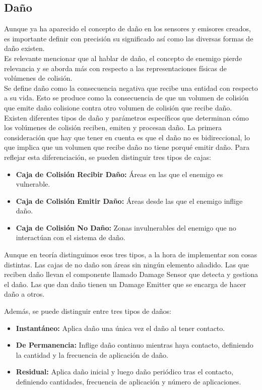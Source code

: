 \subsection{Daño}
Aunque ya ha aparecido el concepto de daño en los sensores y emisores creados, es importante definir con precisión su significado así como las diversas formas de daño existen. \\
Es relevante mencionar que al hablar de daño, el concepto de enemigo pierde relevancia y se aborda más con respecto a las representaciones físicas de volúmenes de colisión.\\
Se define daño como la consecuencia negativa que recibe una entidad con respecto a su vida. Esto se produce como la consecuencia de que un volumen de colisión que emite daño colisione contra otro volumen de colisión que recibe daño.\\
Existen diferentes tipos de daño y parámetros específicos que determinan cómo los volúmenes de colisión reciben, emiten y procesan daño.
La primera consideración que hay que tener en cuenta es que el daño no es bidireccional, lo que implica que un volumen que recibe daño no tiene porqué emitir daño. Para reflejar esta diferenciación, se pueden distinguir tres tipos de cajas:
\begin{itemize}
	 \item \textbf{Caja de Colisión Recibir Daño:} Áreas en las que el enemigo es vulnerable.
	 \item \textbf{Caja de Colisión Emitir Daño:} Áreas desde las que el enemigo inflige daño.
	 \item  \textbf{Caja de Colisión No Daño:} Zonas invulnerables del enemigo que no interactúan con el sistema de daño.
\end{itemize}
Aunque en teoría distinguimos esos tres tipos, a la hora de implementar son cosas distintas. Las cajas de no daño son áreas sin ningún elemento añadido. Las que reciben daño llevan el componente llamado Damage Sensor que detecta y gestiona el daño. Las que dan daño tienen un Damage Emitter que se encarga de hacer daño a otros.

Además, se puede distinguir entre tres tipos de daños:
\begin{itemize}
    \item \textbf{Instantáneo:} Aplica daño una única vez el daño al tener contacto.
    \item \textbf{De Permanencia:} Inflige daño continuo mientras haya contacto, definiendo la cantidad y la frecuencia de aplicación de daño.
    \item \textbf{Residual:} Aplica daño inicial y luego daño periódico tras el contacto, definiendo cantidades, frecuencia de aplicación y número de aplicaciones.
\end{itemize}

